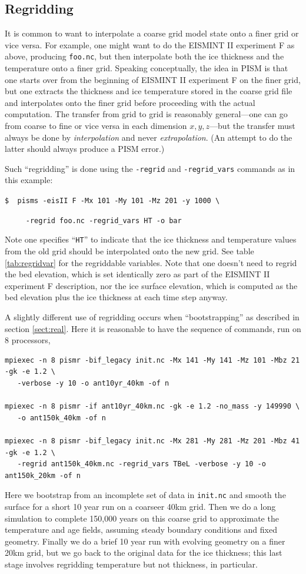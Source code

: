 \documentclass[11pt,final]{amsart}
\begin{document}
\subsection{Regridding}  It is common to want to interpolate a coarse grid model state onto a finer grid or vice versa.  For example, one might want to do the EISMINT II experiment F as above, producing \verb|foo.nc|, but then interpolate both the ice thickness and the temperature onto a finer grid.  Speaking conceptually, the idea in PISM is that one starts over from the beginning of EISMINT II experiment F on the finer grid, but one extracts the thickness and ice temperature stored in the coarse grid file and interpolates onto the finer grid before proceeding with the actual computation.  The transfer from grid to grid is reasonably general---one can go from coarse to fine or vice versa in each dimension $x,y,z$---but the transfer must always be done by \emph{interpolation} and never \emph{extrapolation}.  (An attempt to do the latter should always produce a PISM error.)

Such ``regridding'' is done using the \verb|-regrid| and \verb|-regrid_vars| commands as in this example:

\verb|$  pisms -eisII F -Mx 101 -My 101 -Mz 201 -y 1000 \|

\verb|     -regrid foo.nc -regrid_vars HT -o bar|

\noindent Note one specifies ``\verb|HT|'' to indicate that the ice thickness and temperature values from the old grid should be interpolated onto the new grid.  See table \ref{tab:regridvar} for the regriddable variables.  Note that one doesn't need to regrid the bed elevation, which is set identically zero as part of the EISMINT II experiment F description, nor the ice surface elevation, which is computed as the bed elevation plus the ice thickness at each time step anyway.

A slightly different use of regridding occurs when ``bootstrapping'' as described in section \ref{sect:real}.  Here it is reasonable to have the sequence of commands, run on 8 processors,
\small
\begin{verbatim}
mpiexec -n 8 pismr -bif_legacy init.nc -Mx 141 -My 141 -Mz 101 -Mbz 21 -gk -e 1.2 \
   -verbose -y 10 -o ant10yr_40km -of n

mpiexec -n 8 pismr -if ant10yr_40km.nc -gk -e 1.2 -no_mass -y 149990 \
   -o ant150k_40km -of n

mpiexec -n 8 pismr -bif_legacy init.nc -Mx 281 -My 281 -Mz 201 -Mbz 41 -gk -e 1.2 \
   -regrid ant150k_40km.nc -regrid_vars TBeL -verbose -y 10 -o ant150k_20km -of n
\end{verbatim}
\normalsize
Here we bootstrap from an incomplete set of data in \verb|init.nc| and smooth the surface for a short 10 year run on a coarseer 40km grid.  Then we do a long simulation to complete 150,000 years on this coarse grid to approximate the temperature and age fields, assuming steady boundary conditions and fixed geometry.  Finally we do a brief 10 year run with evolving geometry on a finer 20km grid, but we go back to the original data for the ice thickness; this last stage involves regridding temperature but not thickness, in particular.
\end{document}
